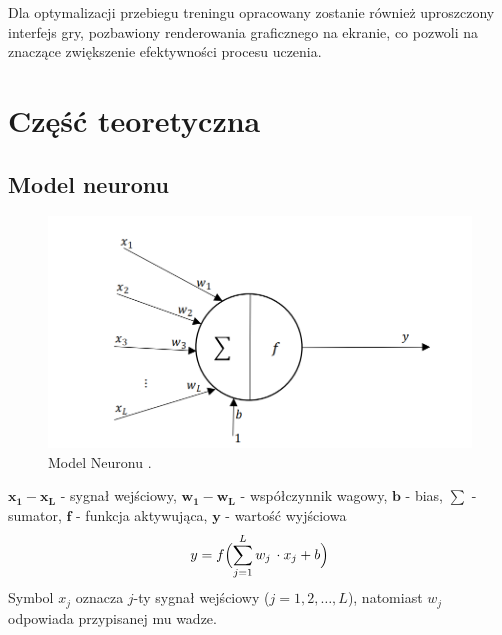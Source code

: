 \documentclass[a4paper,12pt]{article}
\begin{document}
Dla optymalizacji przebiegu treningu opracowany zostanie również uproszczony interfejs gry, pozbawiony renderowania graficznego na ekranie, co pozwoli na znaczące zwiększenie efektywności procesu uczenia.
\clearpage  























\section{Część teoretyczna}
\subsection{Model neuronu}
\begin{figure}[h!]
    \centering
    \includegraphics[width=1\linewidth]{image.png}
    \caption{Model Neuronu \cite{RZajdelNeuron}.}
\end{figure}

\noindent $\boldsymbol{x_1 - x_L}$ - sygnał wejściowy, \newline
 $\boldsymbol{w_1 - w_L}$ - współczynnik wagowy, \newline
$\boldsymbol{b}$ - bias, \newline
$\boldsymbol{\sum}$  - sumator, \newline
$\boldsymbol{f}$ - funkcja aktywująca, \newline
$\boldsymbol{y}$ - wartość wyjściowa 
\begin{equation}
y = f\Bigl(\sum_{j=1}^{L} w_j\,\cdot x_j + b\Bigr)
\end{equation}
Symbol \(x_j\) oznacza \(j\)-ty sygnał wejściowy (\(j = 1, 2, \dots, L\)), natomiast \(w_j\) odpowiada przypisanej mu wadze.
\end{document}
